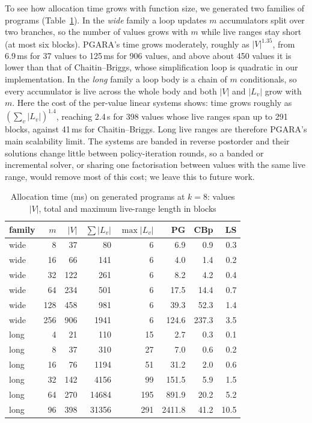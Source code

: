 \documentclass{ieeeaccess}
\newcommand{\MG}{PGARA}
\begin{document}
To see how allocation time grows with function size, we generated two
families of programs (Table~\ref{tab:scale}). In the \emph{wide} family
a loop updates $m$ accumulators split over two branches, so the number
of values grows with $m$ while live ranges stay short (at most six
blocks). \MG's time grows moderately, roughly as $|V|^{1.35}$, from
6.9\,ms for 37 values to 125\,ms for 906 values, and above about 450
values it is lower than that of Chaitin--Briggs, whose simplification
loop is quadratic in our implementation. In the \emph{long} family a loop body
is a chain of $m$ conditionals, so every accumulator is live across the
whole body and both $|V|$ and $|L_v|$ grow with $m$. Here the cost of
the per-value linear systems shows: time grows roughly as
$(\sum_v|L_v|)^{1.4}$, reaching 2.4\,s for 398 values whose live ranges
span up to 291 blocks, against 41\,ms for Chaitin--Briggs. Long live
ranges are therefore \MG's main scalability limit. The systems are
banded in reverse postorder and their solutions change little between
policy-iteration rounds, so a banded or incremental solver, or sharing
one factorisation between values with the same live range, would
remove most of this cost; we leave this to future work.

\begin{table}[t]
\centering
\caption{Allocation time (ms) on generated programs at $k=8$: values
$|V|$, total and maximum live-range length in blocks}
\label{tab:scale}
\footnotesize
\setlength{\tabcolsep}{3pt}
\begin{tabular}{@{}lrrrrrrr@{}}
\toprule
family & $m$ & $|V|$ & $\sum|L_v|$ & $\max|L_v|$ & PG & CBp & LS \\
\midrule
wide & 8 & 37 & 80 & 6 & 6.9 & 0.9 & 0.3 \\
wide & 16 & 66 & 141 & 6 & 4.0 & 1.4 & 0.2 \\
wide & 32 & 122 & 261 & 6 & 8.2 & 4.2 & 0.4 \\
wide & 64 & 234 & 501 & 6 & 17.5 & 14.4 & 0.7 \\
wide & 128 & 458 & 981 & 6 & 39.3 & 52.3 & 1.4 \\
wide & 256 & 906 & 1941 & 6 & 124.6 & 237.3 & 3.5 \\
\midrule
long & 4 & 21 & 110 & 15 & 2.7 & 0.3 & 0.1 \\
long & 8 & 37 & 310 & 27 & 7.0 & 0.6 & 0.2 \\
long & 16 & 76 & 1194 & 51 & 31.2 & 2.0 & 0.6 \\
long & 32 & 142 & 4156 & 99 & 151.5 & 5.9 & 1.5 \\
long & 64 & 270 & 14684 & 195 & 891.9 & 20.2 & 5.2 \\
long & 96 & 398 & 31356 & 291 & 2411.8 & 41.2 & 10.5 \\
\bottomrule
\end{tabular}
\end{table}
\end{document}
